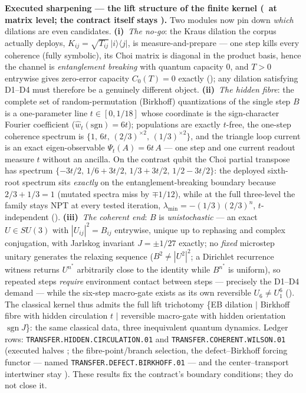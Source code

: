 \documentclass[11pt,a4paper]{article}
\begin{document}
\par\smallskip\noindent\textbf{Executed sharpening --- the lift structure of the finite kernel
(\mE\ at matrix level; the contract itself stays \mO).}  Two modules now pin down \emph{which}
dilations are even candidates.  \textbf{(i)}~\emph{The no-go}: the Kraus dilation the corpus
actually deploys, $K_{ij}=\sqrt{T_{ij}}\,|i\rangle\langle j|$, is measure-and-prepare --- one
step kills every coherence (fully symbolic), its Choi matrix is diagonal in the product basis,
hence the channel is \emph{entanglement breaking} with quantum capacity $0$, and $T>0$
entrywise gives zero-error capacity $C_0(T)=0$ exactly
(); any dilation satisfying D1--D4 must therefore be a
genuinely different object.  \textbf{(ii)}~\emph{The hidden fibre}: the complete set of
random-permutation (Birkhoff) quantizations of the single step $B$ is a one-parameter line
$t\in[0,1/18]$ whose coordinate is the sign-character Fourier coefficient
($\widehat w_t(\mathrm{sgn})=6t$); populations are exactly $t$-free, the one-step coherence
spectrum is $\{1,\,6t,\,(2/3)^{\times2},\,(1/3)^{\times2}\}$, and the triangle loop current is
an exact eigen-observable $\Psi_t(A)=6t\,A$ --- one step and one current readout measure $t$
without an ancilla.  On the contrast qubit the Choi partial transpose has spectrum
$\{-3t/2,\,1/6+3t/2,\,1/3+3t/2,\,1/2-3t/2\}$: the deployed sixth-root spectrum sits
\emph{exactly} on the entanglement-breaking boundary because $2/3+1/3=1$ (mutated spectra miss
by $\mp1/12$), while at the full three-level the family stays NPT at every tested iteration,
$\lambda_{\min}=-(1/3)(2/3)^n$, $t$-independent ().
\textbf{(iii)}~\emph{The coherent end}: $B$ is \emph{unistochastic} --- an exact $U\in SU(3)$
with $|U_{ij}|^2=B_{ij}$ entrywise, unique up to rephasing and complex conjugation, with
Jarlskog invariant $J=\pm1/27$ exactly; no \emph{fixed} microstep unitary generates the
relaxing sequence ($B^2\neq|U^2|^2$; a Dirichlet recurrence witness returns $U^{n^*}$
arbitrarily close to the identity while $B^{n^*}$ is uniform), so repeated steps
\emph{require} environment contact between steps --- precisely the D1--D4 demand --- while the
six-step macro-gate exists as its own reversible $U_6\neq U_1^6$
().  The classical kernel thus admits the full
lift trichotomy \{EB dilation $\mid$ Birkhoff fibre with hidden circulation $t$ $\mid$
reversible macro-gate with hidden orientation $\operatorname{sgn}J$\}: the same classical
data, three inequivalent quantum dynamics.  Ledger rows:
\texttt{TRANSFER.HIDDEN.CIRCULATION.01} and \texttt{TRANSFER.COHERENT.WILSON.01} (executed
halves \mE; the fibre-point/branch selection, the defect--Birkhoff forcing functor --- named
\texttt{TRANSFER.DEFECT.BIRKHOFF.01} --- and the center--transport intertwiner stay \mO).
These results fix the contract's boundary conditions; they do not close it.
\end{document}
